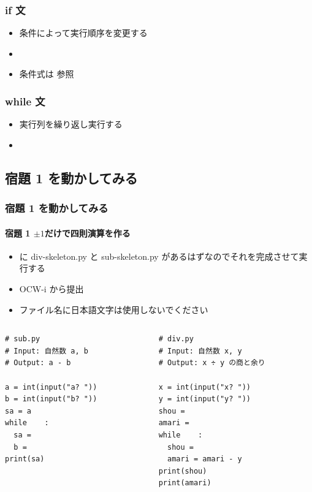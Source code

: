 \begin{frame}[fragile,label=if]
\frametitle{if 文}
  \begin{itemize}
\item 条件によって実行順序を変更する
\item \hyperlink{gcd}{}
\item 条件式は \href{https://docs.python.org/ja/3/reference/expressions.html#comparisons}{}参照
  \end{itemize}
\end{frame}
\begin{frame}[fragile,label=while]
\frametitle{while 文}
  \begin{itemize}
\item 実行列を繰り返し実行する
\item \hyperlink{mult}{}
  \end{itemize}
\end{frame}
\subsection{宿題 1 を動かしてみる}
\begin{frame}
\frametitle{宿題 1 を動かしてみる}
\framesubtitle{宿題 1 \textendash $\pm 1$だけで四則演算を作る}
  \begin{itemize}
\item \href{https://sites.google.com/a/presystems.xyz/sample/home/elementary-computer-science}{} に div-skeleton.py と sub-skeleton.py があるはずなのでそれを完成させて実行する
\item OCW-i から提出
\item ファイル名に日本語文字は使用しないでください
  \end{itemize}
  \begin{columns}
    \begin{column}{0.45\textwidth}
      \begin{lstlisting}[caption={sub.py},label=lst:sub]
# sub.py
# Input: 自然数 a, b
# Output: a - b

a = int(input("a? "))
b = int(input("b? "))
sa = a               
while    :
  sa = 
  b = 
print(sa)
      \end{lstlisting}
    \end{column}
    \begin{column}{0.45\textwidth}
      \begin{lstlisting}[caption={div.py},label=lst:div]
# div.py
# Input: 自然数 x, y
# Output: x ÷ y の商と余り

x = int(input("x? "))
y = int(input("y? "))
shou = 
amari = 
while    :
  shou = 
  amari = amari - y
print(shou)
print(amari)
      \end{lstlisting}
    \end{column}
  \end{columns}
\end{frame}
%
%

